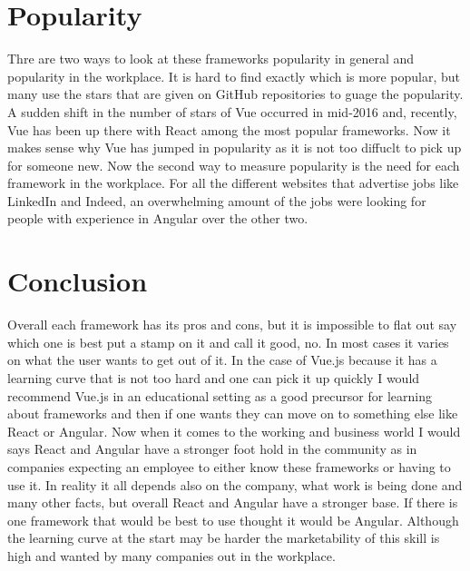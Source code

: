 \documentclass[11pt]{article}
\begin{document}
\section{Popularity}
Thre are two ways to look at these frameworks popularity in general and popularity in the workplace. It is hard to find exactly which is more popular, but many use the stars that are given on GitHub repositories to guage the popularity.
A sudden shift in the number of stars of Vue occurred in mid-2016 and, recently, Vue has been up there with React among the most popular frameworks\cite{Angularv42:online}. Now it makes sense why Vue has jumped in popularity as it is
not too diffuclt to pick up for someone new. Now the second way to measure popularity is the need for each framework in the workplace. For all the different websites that advertise jobs like LinkedIn and Indeed, an overwhelming amount
of the jobs were looking for people with experience in Angular over the other two. 

\section{Conclusion}
Overall each framework has its pros and cons, but it is impossible to flat out say which one is best put a stamp on it and call it good, no. In most cases it varies on what the user wants to get out of it. In the case of Vue.js because 
it has a learning curve that is not too hard and one can pick it up quickly I would recommend Vue.js in an educational setting as a good precursor for learning about frameworks and then if one wants they can move on to something else 
like React or Angular. Now when it comes to the working and business world I would says React and Angular have a stronger foot hold in the community as in companies expecting an employee to either know these frameworks or having to use it.
In reality it all depends also on the company, what work is being done and many other facts, but overall React and Angular have a stronger base. If there is one framework that would be best to use thought it would be Angular. Although 
the learning curve at the start may be harder the marketability of this skill is high and wanted by many companies out in the workplace. 


\printbibliography
\end{document}
